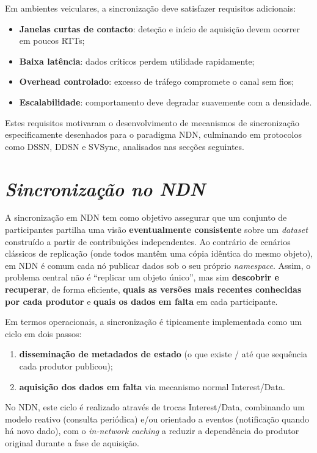 Em ambientes veiculares, a sincronização deve satisfazer requisitos adicionais:

\begin{itemize}
    \item \textbf{Janelas curtas de contacto}: deteção e início de aquisição devem ocorrer em poucos RTTs;
    \item \textbf{Baixa latência}: dados críticos perdem utilidade rapidamente;
    \item \textbf{Overhead controlado}: excesso de tráfego compromete o canal sem fios;
    \item \textbf{Escalabilidade}: comportamento deve degradar suavemente com a densidade.
\end{itemize}

Estes requisitos motivaram o desenvolvimento de mecanismos de sincronização especificamente desenhados para o paradigma \gls{NDN}, culminando em protocolos como \gls{DSSN}, \gls{DDSN} e \gls{SVSync}, analisados nas secções seguintes.


\section{\emph{Sincronização no \gls{NDN}}}
\label{sub:Sinc__NDN}

A sincronização em \gls{NDN} tem como objetivo assegurar que um conjunto de participantes partilha uma visão \textbf{eventualmente consistente} sobre um \textit{dataset} construído a partir de contribuições independentes. Ao contrário de cenários clássicos de replicação (onde todos mantêm uma cópia idêntica do mesmo objeto), em \gls{NDN} é comum cada nó publicar dados sob o seu próprio \textit{namespace}. Assim, o problema central não é “replicar um objeto único”, mas sim \textbf{descobrir e recuperar}, de forma eficiente, \textbf{quais as versões mais recentes conhecidas por cada produtor} e \textbf{quais os dados em falta} em cada participante.

Em termos operacionais, a sincronização é tipicamente implementada como um ciclo em dois passos:
\begin{enumerate}
    \item \textbf{disseminação de metadados de estado} (o que existe / até que sequência cada produtor publicou);
    \item \textbf{aquisição dos dados em falta} via mecanismo normal Interest/Data.
\end{enumerate}
No \gls{NDN}, este ciclo é realizado através de trocas Interest/Data, combinando um modelo reativo (consulta periódica) e/ou orientado a eventos (notificação quando há novo dado), com o \textit{in-network caching} a reduzir a dependência do produtor original durante a fase de aquisição.

